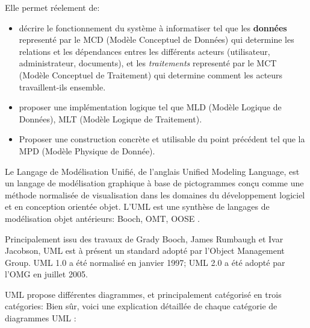 Elle permet réelement de:
\begin{itemize}
    \item décrire le fonctionnement du système à informatiser tel que les \textbf{données} representé par le MCD (Modèle Conceptuel de Données) qui determine les relations et les dépendances entres les différents acteurs (utilisateur, administrateur, documents), et les \emph{traitements} representé par le MCT (Modèle Conceptuel de Traitement) qui determine comment les acteurs travaillent-ils ensemble.
    \item proposer une implémentation logique tel que MLD (Modèle Logique de Données), MLT (Modèle Logique de Traitement).
    \item Proposer une construction concrète et utilisable du point précédent tel que la MPD (Modèle Physique de Donnée).
\end{itemize}

Le Langage de Modélisation Unifié, de l'anglais Unified Modeling Language, est un langage de modélisation graphique à base de pictogrammes conçu comme une méthode normalisée de visualisation dans les domaines du développement logiciel et en conception orientée objet. L'UML est une synthèse de langages de modélisation objet antérieurs: Booch, OMT, OOSE \citep*{UMLorg}.

Principalement issu des travaux de Grady Booch, James Rumbaugh et Ivar Jacobson, UML est à présent un standard adopté par l'Object Management Group. UML 1.0 a été normalisé en janvier 1997; UML 2.0 a été adopté par l'OMG en juillet 2005.

UML propose différentes diagrammes, et principalement catégorisé en trois catégories:
Bien sûr, voici une explication détaillée de chaque catégorie de diagrammes UML :


